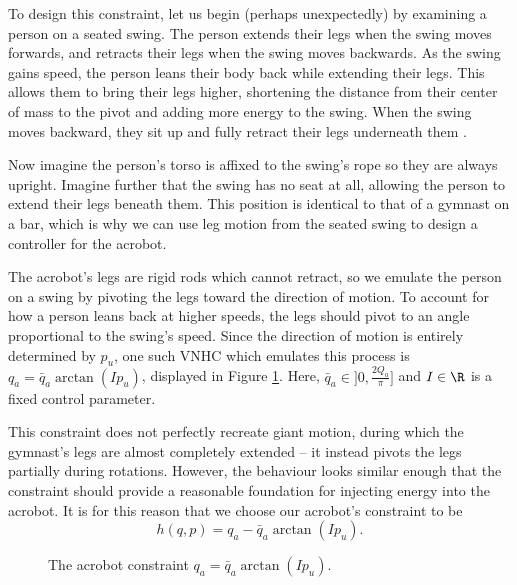 To design this constraint, let us begin (perhaps unexpectedly) by examining a person on
a seated swing.
The person extends their legs when the swing moves forwards, and retracts their
legs when the swing moves backwards.
As the swing gains speed, the person leans their body back while
extending their legs.
This allows them to bring their legs higher, shortening the distance
from their center of mass to the pivot and adding more energy to the swing.
When the swing moves backward, they sit up and fully retract their legs
underneath them \cite{how_to_pump_a_swing}.

Now imagine the person's torso is affixed to the swing's rope so they are
always upright. 
Imagine further that the swing has no seat at all, allowing the person to extend
their legs beneath them. 
This position is identical to that of a gymnast on a bar, which is why we can
use leg motion from the seated swing to design a controller for the acrobot.

The acrobot's legs are rigid rods which cannot retract, so we emulate the person
on a swing by pivoting the legs toward the direction of motion. 
To account for how a person leans back at higher speeds, the legs should pivot to an
angle proportional to the swing's speed.
Since the direction of motion is entirely determined by \(p_u\), 
one such VNHC which emulates this process is \(q_a = \bar{q}_a\arctan( I p_u)\),
displayed in Figure \ref{fig:qa-arctan}.
Here, \(\bar{q}_a \in ]0,\frac{2 Q_a}{\pi}]\) and \(I \in \R\) is a fixed
control parameter.

This constraint does not perfectly recreate giant motion, during which
the gymnast's legs are almost completely extended \cite{usagym_giant}
-- it instead pivots the legs partially during rotations.
However, the behaviour looks similar enough that the constraint should provide a
reasonable foundation for injecting energy into the acrobot.
It is for this reason that we choose our acrobot's constraint to be
\begin{equation}\label{eqn:acrobot-constraint}
    h(q,p) = q_a - \bar{q}_a \arctan(I p_u)
    .
\end{equation}

\begin{figure}
    \centering
    
    \caption{The acrobot constraint \(q_a = \bar{q}_a \arctan(I p_u)\).}
    \label{fig:qa-arctan}
\end{figure}

